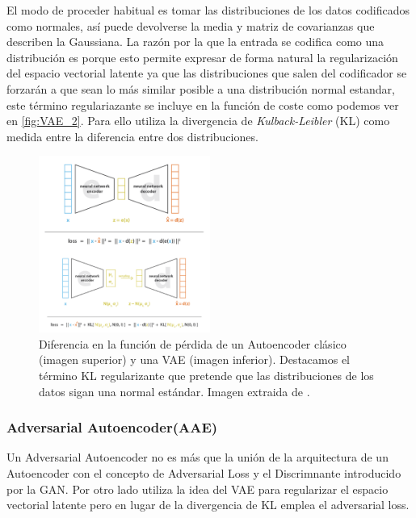             \noindent El modo de proceder habitual es tomar las distribuciones de los datos codificados como normales, así puede devolverse la media y matriz de covarianzas que describen la Gaussiana. La razón por la que la entrada se codifica como una distribución es porque esto permite expresar de forma natural la regularización del espacio vectorial latente ya que las distribuciones que salen del codificador se forzarán a que sean lo más similar posible a una distribución normal estandar, este término regulariazante se incluye en la función de coste como podemos ver en \autoref{fig:VAE_2}. Para ello utiliza la divergencia de \textit{Kulback-Leibler} (KL) como medida entre la diferencia entre dos distribuciones.

            \begin{figure}[!h]
                \centering
                \includegraphics[width=0.5\textwidth]{img/vae_2.png}
                \caption{Diferencia en la función de pérdida de un Autoencoder clásico (imagen superior) y una VAE (imagen inferior). Destacamos el término KL regularizante que pretende que las distribuciones de los datos sigan una normal estándar. Imagen extraida de \cite{VAE}.}
                \label{fig:VAE_2}
            \end{figure}
        
        \subsubsection{Adversarial Autoencoder(AAE)}
            \noindent Un Adversarial Autoencoder no es más que la unión de la arquitectura de un Autoencoder con el concepto de Adversarial Loss y el Discrimnante introducido por la GAN. Por otro lado utiliza la idea del VAE para regularizar el espacio vectorial latente pero en lugar de la divergencia de KL emplea el adversarial loss.

